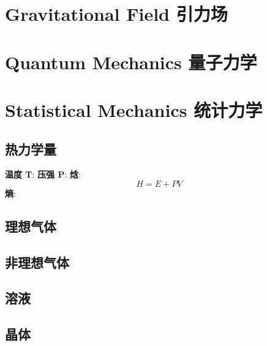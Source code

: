 \documentclass{article}
\begin{document}
\section{Gravitational Field 引力场}



\section{Quantum Mechanics 量子力学}



\section{Statistical Mechanics 统计力学}

\subsection{热力学量}
\textbf{温度 T}:
\textbf{压强 P}:
\textbf{焓}:
\[H = E + P V\]
\textbf{熵}:


\subsection{理想气体}


\subsection{非理想气体}


\subsection{溶液}


\subsection{晶体}
\end{document}
